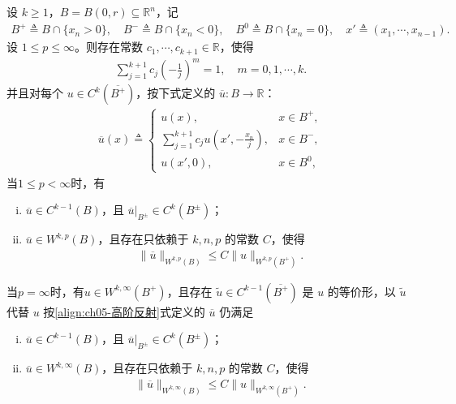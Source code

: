 \documentclass[../../main.tex]{subfiles}
\begin{document}
\begin{lemma}[半空间上的高阶反射]\label{lemma:ch05-高阶反射}
设 $k\geqslant1$，$B=B(0,r)\subseteq\mathbb{R}^{n}$，记
\begin{align*}
B^{+}\triangleq B\cap\{x_n>0\},\quad
B^{-}\triangleq B\cap\{x_n<0\},\quad
B^{0}\triangleq B\cap\{x_n=0\},\quad
x'\triangleq(x_1,\cdots,x_{n-1}).
\end{align*}
设 $1\leqslant p\leqslant\infty$。则存在常数 $c_1,\cdots,c_{k+1}\in\mathbb{R}$，使得
\begin{align}
\sum_{j=1}^{k+1}c_j\left(-\frac{1}{j}\right)^{m}=1,\quad m=0,1,\cdots,k.
\label{eq:ch05-反射矩条件}
\end{align}
并且对每个 $u\in C^{k}(\overline{B^{+}})$，按下式定义的 $\overline{u}:B\to\mathbb{R}$：
\begin{align}
\overline{u}(x)\triangleq
\begin{cases}
u(x), & x\in B^{+},\\
\displaystyle\sum_{j=1}^{k+1}c_ju\left(x',-\frac{x_n}{j}\right), & x\in B^{-},\\
u(x',0), & x\in B^{0},
\end{cases}
\label{align:ch05-高阶反射}
\end{align}
当$1\leqslant p<\infty$时，有
\begin{enumerate}[(i)]
\item $\overline{u}\in C^{k-1}(B)$，且 $\overline{u}|_{B^{\pm}}\in C^{k}(B^{\pm})$；
\item $\overline{u}\in W^{k,p}(B)$，且存在只依赖于 $k,n,p$ 的常数 $C$，使得
\begin{align}
\|\overline{u}\|_{W^{k,p}(B)}\leqslant C\|u\|_{W^{k,p}(B^{+})}.
\label{eq:ch05-反射估计}
\end{align}
\end{enumerate}
当$p=\infty$时，有$u\in W^{k,\infty}(B^{+})$，且存在 $\widetilde{u}\in C^{k-1}(\overline{B^{+}})$ 是 $u$ 的等价形，以 $\widetilde{u}$ 代替 $u$ 按\eqref{align:ch05-高阶反射}式定义的 $\overline{u}$ 仍满足
\begin{enumerate}[(i)]
\item $\overline{u}\in C^{k-1}(B)$，且 $\overline{u}|_{B^{\pm}}\in C^{k}(B^{\pm})$；
\item $\overline{u}\in W^{k,\infty}(B)$，且存在只依赖于 $k,n,p$ 的常数 $C$，使得
\begin{align}
\|\overline{u}\|_{W^{k,\infty}(B)}\leqslant C\|u\|_{W^{k,\infty}(B^{+})}.
\end{align}
\end{enumerate}
\end{lemma}
\end{document}
